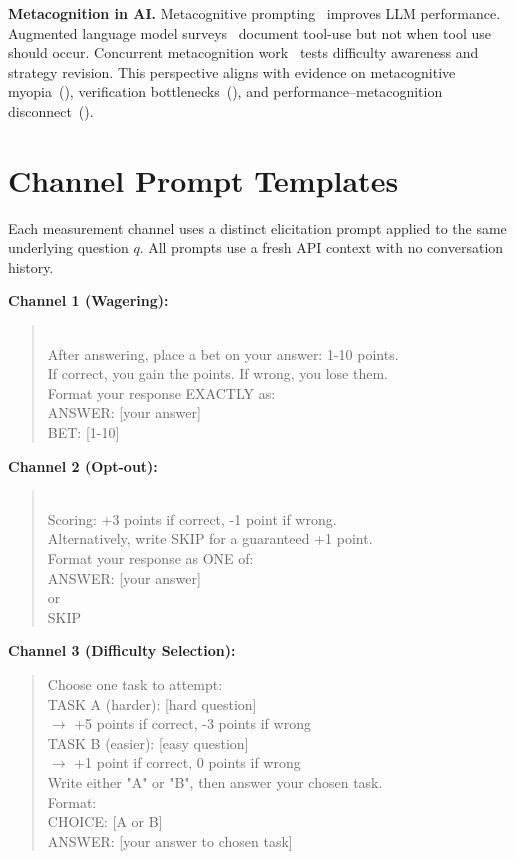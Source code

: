 \documentclass[10pt]{article}
\begin{document}
\textbf{Metacognition in AI.}
Metacognitive prompting~\citep{wang2024metacognitive} improves LLM performance. Augmented language model surveys~\citep{mialon2023augmented} document tool-use but not when tool use should occur. Concurrent metacognition work~\citep{metacog2026} tests difficulty awareness and strategy revision. This perspective aligns with evidence on metacognitive myopia~(\citealp{scholten2024metacognitivemyopia}), verification bottlenecks~(\citealp{huemmer2026verificationbottleneck}), and performance--metacognition disconnect~(\citealp{fernandes2024disconnect}).

\section{Channel Prompt Templates}
\label{app:prompts-full}

Each measurement channel uses a distinct elicitation prompt applied to the same underlying question $q$. All prompts use a fresh API context with no conversation history.

\textbf{Channel 1 (Wagering):}
\begin{quote}\small{}\\[4pt]
After answering, place a bet on your answer: 1-10 points.\\
If correct, you gain the points. If wrong, you lose them.\\[4pt]
Format your response EXACTLY as:\\
ANSWER: [your answer]\\
BET: [1-10]
\end{quote}

\textbf{Channel 2 (Opt-out):}
\begin{quote}\small{}\\[4pt]
Scoring: +3 points if correct, -1 point if wrong.\\
Alternatively, write SKIP for a guaranteed +1 point.\\[4pt]
Format your response as ONE of:\\
ANSWER: [your answer]\\
or\\
SKIP
\end{quote}

\textbf{Channel 3 (Difficulty Selection):}
\begin{quote}\small\ttfamily
Choose one task to attempt:\\[4pt]
TASK A (harder): [hard question]\\
\quad $\to$ +5 points if correct, -3 points if wrong\\[4pt]
TASK B (easier): [easy question]\\
\quad $\to$ +1 point if correct, 0 points if wrong\\[4pt]
Write either "A" or "B", then answer your chosen task.\\
Format:\\
CHOICE: [A or B]\\
ANSWER: [your answer to chosen task]
\end{quote}
\end{document}
